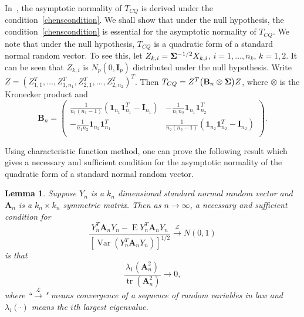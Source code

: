\documentclass[review]{elsarticle}
\DeclareMathOperator{\mytr}{tr}
\DeclareMathOperator{\myE}{E}
\DeclareMathOperator{\myVar}{Var}
\newcommand{\BA}{\mathbf{A}}    \newcommand{\BB}{\mathbf{B}}    \newcommand{\BC}{\mathbf{C}}    \newcommand{\BD}{\mathbf{D}}    \newcommand{\BE}{\mathbf{E}}    \newcommand{\BF}{\mathbf{F}}    \newcommand{\BG}{\mathbf{G}}    \newcommand{\BH}{\mathbf{H}}    \newcommand{\BI}{\mathbf{I}}    \newcommand{\BJ}{\mathbf{J}}    \newcommand{\BK}{\mathbf{K}}    \newcommand{\BL}{\mathbf{L}}
\theoremstyle{plain}
\newtheorem{lemma}{\quad\quad Lemma}
\theoremstyle{definition}
\theoremstyle{remark}
\begin{document}
    In~\cite{Chen2010A}, the asymptotic normality of $T_{CQ}$ is derived under the condition~\eqref{chenscondition}.
    We shall show that under the null hypothesis, the condition~\eqref{chenscondition} is essential for the asymptotic normality of $T_{CQ}$.
We note that under the null hypothesis, $T_{CQ}$ is a quadratic form of a standard normal random vector.
To see this,
let $Z_{k,i}=\boldsymbol{\Sigma}^{-1/2}X_{k,i}$, $i=1,\ldots,n_k$, $k=1,2$.
It can be seen that $Z_{k,i}$ is $ N_p(0,\BI_{p})$ distributed under the null hypothesis.
Write $Z=(Z_{1,1}^T,\ldots,Z_{1,n_1}^T,Z_{2,1}^T,\ldots,Z_{2,n_2}^T)^T$.
    Then 
        $
        T_{CQ}=Z^T \big( \BB_n\otimes \bSigma \big) Z
        $,
    where $\otimes$ is the Kronecker product and
    \begin{equation*}
        \BB_n=\begin{pmatrix}
            \frac{1}{n_1(n_1-1)}(\mathbf{1}_{n_1} \mathbf{1}_{n_1}^T-\BI_{n_1})&
            -\frac{1}{n_1 n_2}\mathbf{1}_{n_1} \mathbf{1}_{n_2}^T\\
            -\frac{1}{n_1 n_2}\mathbf{1}_{n_2} \mathbf{1}_{n_1}^T&
            \frac{1}{n_2(n_2-1)}( \mathbf{1}_{n_2} \mathbf{1}_{n_2}^T-\BI_{n_2})\\
        \end{pmatrix}.
    \end{equation*}
    
Using characteristic function method, one can prove the following result which gives a necessary and sufficient condition for the asymptotic normality of the quadratic form of a standard normal random vector.
\begin{lemma}\label{quadraticFormCLT}
    Suppose $Y_{n}$ is a $k_n$ dimensional standard normal random vector and $\BA_n$ is a $k_n\times k_n$ symmetric matrix. Then as $n\to \infty$, a necessary and sufficient condition for
    \begin{equation}\label{quadratic}
        \frac{Y_n^T \BA_n Y_n-\myE Y_n^T \BA_n Y_n}{{[\myVar (Y_n^T \BA_n Y_n)]}^{1/2}}\xrightarrow{\mathcal{L}}N(0,1)
    \end{equation}
    is that
    \begin{equation}\label{quadraticEigen}
        \frac{\lambda_{1}(\BA_n^2)}{\mytr(\BA_n^2)}\to 0,
    \end{equation}
    where ``$\xrightarrow{\mathcal{L}}$" means convergence of a sequence of random variables in law and $\lambda_{i}(\cdot)$ means the $i$th largest eigenvalue.
\end{lemma}
\end{document}
